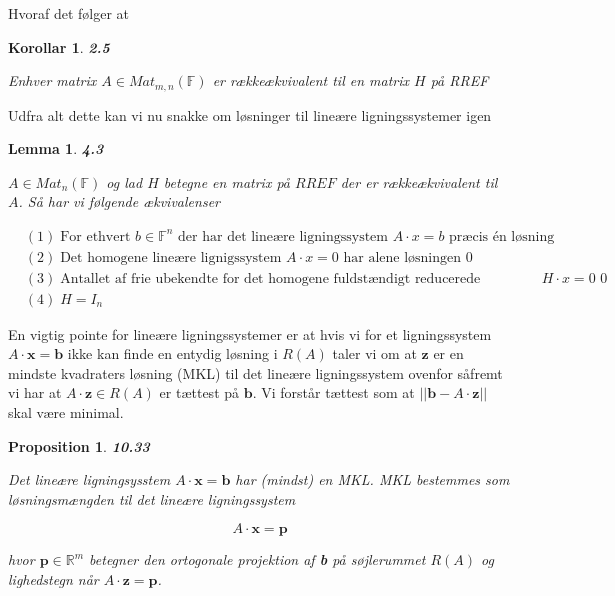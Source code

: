 \documentclass[paper=a4, fontsize=11pt]{scrartcl} %
\newtheorem*{korollar}{Korollar}
\newtheorem*{lemma}{Lemma}
\newtheorem*{proposition}{Proposition}
\newenvironment{cstmproposition}[1]{\begin{proposition} {\normalfont\textbf{#1}}}{\end{proposition}}
\newenvironment{cstmkorollar}[1]{\begin{korollar} {\normalfont\textbf{#1}}}{\end{korollar}}
\newenvironment{cstmlemma}[1]{\begin{lemma} {\normalfont\textbf{#1}}}{\end{lemma}}
\begin{document}
	Hvoraf det følger at
	
	\begin{cstmkorollar}{2.5}
		
		Enhver matrix $A \in Mat_{m,n}(\mathbb{F})$ er rækkeækvivalent til en matrix $H$ på RREF
		
	\end{cstmkorollar}
	
	Udfra alt dette kan vi nu snakke om løsninger til lineære ligningssystemer igen
	
	\begin{cstmlemma}{4.3}
		
		$A \in Mat_n(\mathbb{F})$ og lad $H$ betegne en matrix på $RREF$ der er rækkeækvivalent til $A$. Så har vi følgende ækvivalenser
		
		\begin{align*}
			&(1) \; \mbox{For ethvert } b \in \mathbb{F}^n \mbox{ der har det lineære ligningssystem } A \cdot x = b \mbox{ præcis én løsning}\\
			&(2) \; \mbox{Det homogene lineære lignigssystem } A \cdot x = 0 \mbox{ har alene løsningen } 0\\
			&(3) \; \mbox{Antallet af frie ubekendte for det homogene fuldstændigt reducerede ligningssystem } H \cdot x = 0 \mbox{ 0}\\
			&(4) \; H = I_n
		\end{align*}
		
		
		
	\end{cstmlemma}
	
	
	En vigtig pointe for lineære ligningssystemer er at hvis vi for et ligningssystem $A \cdot \textbf{x} = \textbf{b}$ ikke kan finde en entydig løsning i $R(A)$ taler vi om at $\textbf{z}$ er en mindste kvadraters løsning (MKL) til det lineære ligningssystem ovenfor såfremt vi har at $A \cdot \textbf{z} \in R(A)$ er tættest på $\textbf{b}$. Vi forstår tættest som at $||\textbf{b} - A \cdot \textbf{z}||$ skal være minimal. 
	
	\begin{cstmproposition}{10.33}
		
		Det lineære ligningsysstem $A \cdot \textbf{x} = \textbf{b}$ har (mindst) en MKL. MKL bestemmes som løsningsmængden til det lineære ligningssystem
		
		\[A \cdot \textbf{x} = \textbf{p}\]
		
		hvor $\textbf{p} \in \mathbb{R}^m$ betegner den ortogonale projektion af \textbf{b} på søjlerummet $R(A)$ og lighedstegn når $A \cdot \textbf{z} = \textbf{p}$.
	\end{cstmproposition}
	
\end{document}
